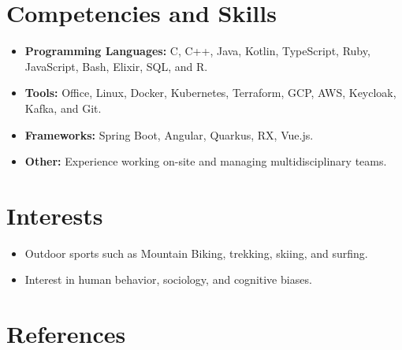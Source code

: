 \documentclass[11pt,letterpaper,sans]{moderncv}        %
\begin{document}
\section{Competencies and Skills}

\vspace{6pt}

\begin{itemize}

\item \textbf{Programming Languages:} C, C++, Java, Kotlin, TypeScript, Ruby, JavaScript, Bash, Elixir, SQL, and R.
\vspace{6pt}

\item \textbf{Tools:} Office, Linux, Docker, Kubernetes, Terraform, GCP, AWS, Keycloak, Kafka, and Git.
\vspace{6pt}

\item \textbf{Frameworks:} Spring Boot, Angular, Quarkus, RX, Vue.js.
\vspace{6pt}

\item \textbf{Other:} Experience working on-site and managing multidisciplinary teams.

\end{itemize}

\section{Interests}

\vspace{6pt}

\begin{itemize}

\item{Outdoor sports such as Mountain Biking, trekking, skiing, and surfing.}

\vspace{6pt}

\item{Interest in human behavior, sociology, and cognitive biases.}

\vspace{6pt}



\end{itemize}

\section{References}
\end{document}
